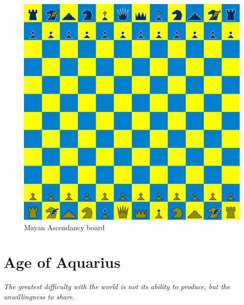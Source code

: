 \documentclass[a5paper,12pt,draft]{book} %
\begin{document}
\noindent
\begin{figure}[h]
\includegraphics[width=1.0\textwidth, keepaspectratio=true]{../gfx/boards/06_mayan_ascendancy.png}
\caption{Mayan Ascendancy board}
\label{fig:mayan_ascendancy}
\end{figure}

\clearpage

\chapter*{Age of Aquarius}

\begin{flushright}
\parbox{0.8\textwidth}{
\emph{The greatest difficulty with the world is not its ability to produce, but the unwillingness to share. \\
 } }
\end{flushright}
\end{document}
